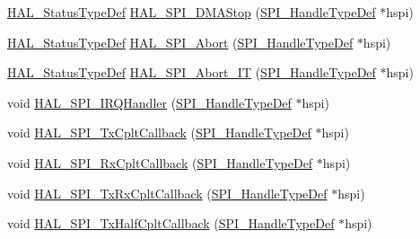 \begin{DoxyCompactItemize}
\item 
\hyperlink{stm32f4xx__hal__def_8h_a63c0679d1cb8b8c684fbb0632743478f}{H\+A\+L\+\_\+\+Status\+Type\+Def} \hyperlink{group___s_p_i___exported___functions___group2_ga7e01eb529af91fabc950180b927fa355}{H\+A\+L\+\_\+\+S\+P\+I\+\_\+\+D\+M\+A\+Stop} (\hyperlink{group___s_p_i___exported___types_gab3bd115785297692c125528b7293566b}{S\+P\+I\+\_\+\+Handle\+Type\+Def} $\ast$hspi)
\item 
\hyperlink{stm32f4xx__hal__def_8h_a63c0679d1cb8b8c684fbb0632743478f}{H\+A\+L\+\_\+\+Status\+Type\+Def} \hyperlink{group___s_p_i___exported___functions___group2_ga11c74b1d91d88ff336f674f6376cc904}{H\+A\+L\+\_\+\+S\+P\+I\+\_\+\+Abort} (\hyperlink{group___s_p_i___exported___types_gab3bd115785297692c125528b7293566b}{S\+P\+I\+\_\+\+Handle\+Type\+Def} $\ast$hspi)
\item 
\hyperlink{stm32f4xx__hal__def_8h_a63c0679d1cb8b8c684fbb0632743478f}{H\+A\+L\+\_\+\+Status\+Type\+Def} \hyperlink{group___s_p_i___exported___functions___group2_ga75d7782876ed13b9f8aebfa8dbba5a1c}{H\+A\+L\+\_\+\+S\+P\+I\+\_\+\+Abort\+\_\+\+IT} (\hyperlink{group___s_p_i___exported___types_gab3bd115785297692c125528b7293566b}{S\+P\+I\+\_\+\+Handle\+Type\+Def} $\ast$hspi)
\item 
void \hyperlink{group___s_p_i___exported___functions___group2_gaf3da6e0a87468bc039b578c21329df47}{H\+A\+L\+\_\+\+S\+P\+I\+\_\+\+I\+R\+Q\+Handler} (\hyperlink{group___s_p_i___exported___types_gab3bd115785297692c125528b7293566b}{S\+P\+I\+\_\+\+Handle\+Type\+Def} $\ast$hspi)
\item 
void \hyperlink{group___s_p_i___exported___functions___group2_ga0a99ab4f6aa6ee7dc2abca5483910dde}{H\+A\+L\+\_\+\+S\+P\+I\+\_\+\+Tx\+Cplt\+Callback} (\hyperlink{group___s_p_i___exported___types_gab3bd115785297692c125528b7293566b}{S\+P\+I\+\_\+\+Handle\+Type\+Def} $\ast$hspi)
\item 
void \hyperlink{group___s_p_i___exported___functions___group2_ga3df7021fe24cf874f8b1eec5bd5f4cb3}{H\+A\+L\+\_\+\+S\+P\+I\+\_\+\+Rx\+Cplt\+Callback} (\hyperlink{group___s_p_i___exported___types_gab3bd115785297692c125528b7293566b}{S\+P\+I\+\_\+\+Handle\+Type\+Def} $\ast$hspi)
\item 
void \hyperlink{group___s_p_i___exported___functions___group2_ga04e63f382f172164c8e7cae4ff5d883c}{H\+A\+L\+\_\+\+S\+P\+I\+\_\+\+Tx\+Rx\+Cplt\+Callback} (\hyperlink{group___s_p_i___exported___types_gab3bd115785297692c125528b7293566b}{S\+P\+I\+\_\+\+Handle\+Type\+Def} $\ast$hspi)
\item 
void \hyperlink{group___s_p_i___exported___functions___group2_ga931ef2f7fd94ffa16ec431972b1b237f}{H\+A\+L\+\_\+\+S\+P\+I\+\_\+\+Tx\+Half\+Cplt\+Callback} (\hyperlink{group___s_p_i___exported___types_gab3bd115785297692c125528b7293566b}{S\+P\+I\+\_\+\+Handle\+Type\+Def} $\ast$hspi)

\end{DoxyCompactItemize}
